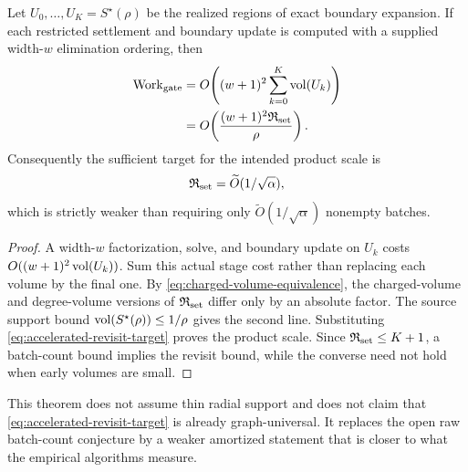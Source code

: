 \begin{theorem}
\label{thm:rppr-revisit-bound}
Let $U_0,\ldots,U_K=S^\star(\rho)$ be the realized regions of exact boundary
expansion.  If each restricted settlement and boundary update is computed
with a supplied width-$w$ elimination ordering, then
\begin{align}
 \operatorname{Work}_{\rm gate}
 &=O\!\left((w+1)^2
   \sum_{k=0}^K\operatorname{vol}(U_k)\right)
 \notag\\
 &=O\!\left(
  \frac{(w+1)^2\mathfrak R_{\rm set}}{\rho}
 \right).
 \label{eq:rppr-revisit-work}
\end{align}
Consequently the sufficient target for the intended product scale is
\begin{equation}
 \mathfrak R_{\rm set}
 =\widetilde O(1/\sqrt\alpha),
 \label{eq:accelerated-revisit-target}
\end{equation}
which is strictly weaker than requiring only
$\widetilde O(1/\sqrt\alpha)$ nonempty batches.
\end{theorem}

\begin{proof}
A width-$w$ factorization, solve, and boundary update on $U_k$ costs
$O((w+1)^2\operatorname{vol}(U_k))$.  Sum this actual stage cost rather than replacing each
volume by the final one.  By
\cref{eq:charged-volume-equivalence}, the charged-volume and degree-volume
versions of $\mathfrak R_{\rm set}$ differ only by an absolute factor.  The
source support bound $\operatorname{vol}(S^\star(\rho))\leq1/\rho$ gives the second line.
Substituting \cref{eq:accelerated-revisit-target} proves the product scale.
Since $\mathfrak R_{\rm set}\leq K+1$, a batch-count bound implies the revisit
bound, while the converse need not hold when early volumes are small.
\end{proof}

This theorem does not assume thin radial support and does not claim that
\cref{eq:accelerated-revisit-target} is already graph-universal.  It replaces
the open raw batch-count conjecture by a weaker amortized statement that is
closer to what the empirical algorithms measure.
